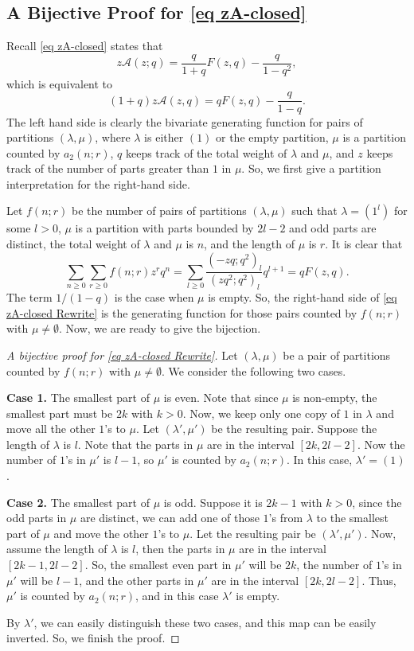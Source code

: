 \documentclass[10pt,a4paper]{amsart}
\numberwithin{equation}{section}
\begin{document}
\subsection{A Bijective Proof for \eqref{eq zA-closed}} Recall \eqref{eq zA-closed} states that
\begin{equation*}
z\mathcal{A}(z;q)=\frac{q}{1+q}F(z,q)-\frac{q}{1-q^2},
\end{equation*}
which is equivalent to
\begin{equation}\label{eq zA-closed Rewrite}
(1+q)z\mathcal{A}(z,q)=qF(z,q)-\frac{q}{1-q}.
\end{equation}
The left hand side is clearly the bivariate generating function for pairs of partitions $(\lambda,\mu)$, where $\lambda$ is either $(1)$ or the empty partition, $\mu$ is a partition counted by $a_2(n;r)$, $q$ keeps track of the total weight of $\lambda$ and $\mu$, and $z$ keeps track of the number of parts greater than $1$ in $\mu$. So, we first give a partition interpretation for the right-hand side.

Let $f(n;r)$ be the number of pairs of partitions $(\lambda,\mu)$ such that $\lambda=(1^{l})$ for some $l>0$, $\mu$ is a partition with parts bounded by $2l-2$ and odd parts are distinct, the total weight of $\lambda$ and $\mu$ is $n$, and the length of $\mu$ is $r$. It is clear that
$$\sum_{n\geq0}\sum_{r\geq0}f(n;r)z^rq^n=\sum_{l\geq0}\frac{(-zq;q^2)_l}{(zq^2;q^2)_l}q^{l+1}=qF(z,q).$$
The term $1/(1-q)$ is the case when $\mu$ is empty. So, the right-hand side of \eqref{eq zA-closed Rewrite} is the generating function for those pairs counted by $f(n;r)$ with $\mu\neq\emptyset$. Now, we are ready to give the bijection.
\begin{proof}[A bijective proof for \eqref{eq zA-closed Rewrite}] Let $(\lambda,\mu)$ be a pair of partitions counted by $f(n;r)$ with $\mu\neq\emptyset$. We consider the following two cases.

\textbf{Case 1.} The smallest part of $\mu$ is even. Note that since $\mu$ is non-empty, the smallest part must be $2k$ with $k>0$. Now, we keep only one copy of $1$ in $\lambda$ and move all the other $1$'s to $\mu$. Let $(\lambda',\mu')$ be the resulting pair. Suppose the length of $\lambda$ is $l$. Note that the parts in $\mu$ are in the interval $[2k,2l-2]$. Now the number of $1$'s in $\mu'$ is $l-1$, so $\mu'$ is counted by $a_2(n;r)$. In this case, $\lambda'=(1)$.

\textbf{Case 2.} The smallest part of $\mu$ is odd. Suppose it is $2k-1$ with $k>0$, since the odd parts in $\mu$ are distinct, we can add one of those $1$'s from $\lambda$ to the smallest part of $\mu$ and move the other $1$'s to $\mu$. Let the resulting pair be $(\lambda',\mu')$. Now, assume the length of $\lambda$ is $l$, then the parts in $\mu$ are in the interval $[2k-1,2l-2]$. So, the smallest even part in $\mu'$ will be $2k$, the number of $1$'s in $\mu'$ will be $l-1$, and the other parts in $\mu'$ are in the interval $[2k,2l-2]$. Thus, $\mu'$ is counted by $a_2(n;r)$, and in this case $\lambda'$ is empty.

By $\lambda'$, we can easily distinguish these two cases, and this map can be easily inverted. So, we finish the proof.
\end{proof}
\end{document}
